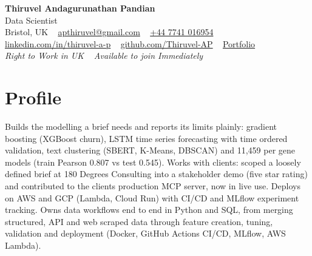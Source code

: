 \documentclass[a4paper,11pt]{article}
\begin{document}
\begin{center}
  {\fontsize{22}{26}\selectfont\bfseries\color{navy} Thiruvel Andagurunathan Pandian}\\[4pt]
  {\fontsize{12}{14}\selectfont\color{navy} Data Scientist}\\[4pt]
  {\small
  Bristol, UK\nobreak\ \,\textperiodcentered\, \href{mailto:apthiruvel@gmail.com}{apthiruvel@gmail.com}\nobreak\ \,\textperiodcentered\, \href{tel:+447741016954}{+44 7741 016954}\nobreak\ \,\textperiodcentered\, \href{https://www.linkedin.com/in/thiruvel-a-p/}{linkedin.com/in/thiruvel-a-p}\nobreak\ \,\textperiodcentered\, \href{https://github.com/Thiruvel-AP}{github.com/Thiruvel-AP}\nobreak\ \,\textperiodcentered\, \href{https://thiruvel-ap.github.io/PersonalPortfolio/}{Portfolio}}\\[3pt]
  {\small\itshape\color{muted} Right to Work in UK\nobreak\ \,\textperiodcentered\, Available to join Immediately}

\end{center}

\section{Profile}
Builds the modelling a brief needs and reports its limits plainly: gradient boosting (XGBoost churn), LSTM time series forecasting with time ordered validation, text clustering (SBERT, K-Means, DBSCAN) and 11,459 per gene models (train Pearson 0.807 vs test 0.545). Works with clients: scoped a loosely defined brief at 180 Degrees Consulting into a stakeholder demo (five star rating) and contributed to the client\textquotesingle{}s production MCP server, now in live use. Deploys on AWS and GCP (Lambda, Cloud Run) with CI/CD and MLflow experiment tracking. Owns data workflows end to end in Python and SQL, from merging structured, API and web scraped data through feature creation, tuning, validation and deployment (Docker, GitHub Actions CI/CD, MLflow, AWS Lambda).
\end{document}
